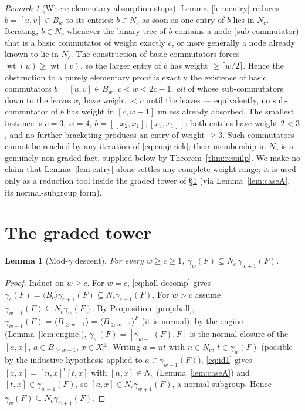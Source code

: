 \documentclass{amsart}
\newtheorem{lemma}{Lemma}
\theoremstyle{definition}
\theoremstyle{remark}
\newtheorem{remark}{Remark}
\begin{document}
\begin{remark}[Where elementary absorption stops]\label{rem:hardcore}
Lemma~\ref{lem:entry} reduces $b=[u,v]\in B_w$ to its entries: $b\in N_c$ as soon as
one entry of $b$ lies in $N_c$. Iterating, $b\in N_c$ whenever the binary tree of
$b$ contains a node (sub-commutator) that is a basic commutator of weight exactly
$c$, or more generally a node already known to lie in $N_c$. The construction of
basic commutators forces $\operatorname{wt}(u)\ge\operatorname{wt}(v)$, so the larger
entry of $b$ has weight $\ge\lceil w/2\rceil$. Hence the obstruction to a purely
elementary proof is exactly the existence of basic commutators $b=[u,v]\in B_w$,
$c<w<2c-1$, \emph{all} of whose sub-commutators down to the leaves $x_i$ have weight
$<c$ until the leaves --- equivalently, no sub-commutator of $b$ has weight in
$[c,w-1]$ unless already absorbed. The smallest instance is $c=3$, $w=4$,
$b=[[x_2,x_1],[x_3,x_1]]$: both entries have weight $2<3$, and no further bracketing
produces an entry of weight $\ge 3$. Such commutators cannot be reached by any
iteration of \eqref{eq:conjtrick}; their membership in $N_c$ is a genuinely
non-graded fact, supplied below by Theorem~\ref{thm:resnilp}. We make no claim that
Lemma~\ref{lem:entry} alone settles any complete weight range; it is used only as a
reduction tool inside the graded tower of \S\ref{sec:tower} (via
Lemma~\ref{lem:caseA}, its normal-subgroup form).
\end{remark}

\section{The graded tower}\label{sec:tower}

\begin{lemma}[Mod-$\gamma$ descent]\label{lem:moddescent}
For every $w\ge c\ge1$, $\gamma_w(F)\subseteq N_c\,\gamma_{w+1}(F)$.
\end{lemma}
\begin{proof}
Induct on $w\ge c$. For $w=c$, \eqref{eq:hall-decomp} gives
$\gamma_c(F)=\langle B_c\rangle\gamma_{c+1}(F)\subseteq N_c\gamma_{c+1}(F)$. For
$w>c$ assume $\gamma_{w-1}(F)\subseteq N_c\gamma_w(F)$. By
Proposition~\ref{prop:hall}, $\gamma_{w-1}(F)=\langle B_{\ge w-1}\rangle=\langle
B_{\ge w-1}\rangle^{F}$ (it is normal); by the engine
(Lemma~\ref{lem:engine}), $\gamma_w(F)=[\gamma_{w-1}(F),F]$ is the normal closure of
the $[a,x]$, $a\in B_{\ge w-1}$, $x\in X^{\pm}$. Writing $a=nt$ with $n\in N_c$,
$t\in\gamma_w(F)$ (possible by the inductive hypothesis applied to
$a\in\gamma_{w-1}(F)$), \eqref{eq:id1} gives $[a,x]=[n,x]^t[t,x]$ with
$[n,x]\in N_c$ (Lemma~\ref{lem:caseA}) and $[t,x]\in\gamma_{w+1}(F)$, so
$[a,x]\in N_c\gamma_{w+1}(F)$, a normal subgroup. Hence
$\gamma_w(F)\subseteq N_c\gamma_{w+1}(F)$.
\end{proof}
\end{document}
